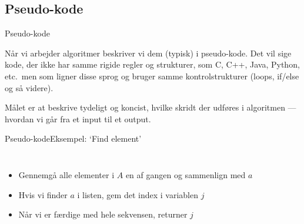 \documentclass[aspectratio=1610]{beamer}
\begin{document}
\subsection{Pseudo-kode}

\begin{frame}{Pseudo-kode}

    Når vi arbejder algoritmer beskriver vi dem (typisk) i \alert{pseudo-kode}.
    Det vil sige kode, der ikke har samme rigide regler og strukturer, som C,
    C++, Java, Python, etc.\ men som ligner disse sprog og bruger samme
    kontrolstrukturer (loops, if/else og så videre).

    \medskip

    Målet er at beskrive \alert{tydeligt og koncist}, hvilke skridt der udføres
    i algoritmen --- hvordan vi går fra et \alert{input} til et \alert{output}.

\end{frame}

\begin{frame}{Pseudo-kode}{Eksempel: `Find element'}

    \begin{columns}
        \begin{itemize}
            \item Gennemgå alle elementer i $A$ en af gangen og sammenlign med
                $a$
            \item Hvis vi finder $a$ i listen, gem det index i variablen
                $j$
            \item Når vi er færdige med hele sekvensen, returner $j$
        \end{itemize}



    \end{columns}

\end{frame}
\end{document}
